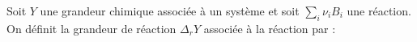 ﻿\documentclass[a4paper]{article}
\begin{document}
\pagestyle{fancy}
\fancyhf{}
\setlength{\headheight}{15pt}

\begin{center}
	\large{}
\end{center}


Soit \(Y\) une grandeur chimique associée à un système et soit \(\sum\limits_i\nu_iB_i\) une réaction.\\
On définit la grandeur de réaction \(\Delta_rY\) associée à la réaction par :\begin{center}\end{center}
\end{document}
